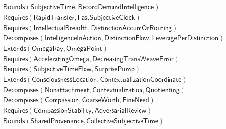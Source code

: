 \documentclass[11pt]{article}
\begin{document}
\[
\begin{aligned}
  &\mathsf{Bounds}(\mathsf{SubjectiveTime}, \mathsf{RecordDemandIntelligence}) \\
  &\mathsf{Requires}(\mathsf{RapidTransfer}, \mathsf{FastSubjectiveClock}) \\
  &\mathsf{Requires}(\mathsf{IntellectualBreadth}, \mathsf{DistinctionAccumOrRouting}) \\
  &\mathsf{Decomposes}(\mathsf{IntelligenceInAction}, \mathsf{DistinctionFlow}, \mathsf{LeveragePerDistinction}) \\
  &\mathsf{Extends}(\mathsf{OmegaRay}, \mathsf{OmegaPoint}) \\
  &\mathsf{Requires}(\mathsf{AcceleratingOmega}, \mathsf{DecreasingTransWeaveError}) \\
  &\mathsf{Requires}(\mathsf{SubjectiveTimeFlow}, \mathsf{SurprisePump}) \\
  &\mathsf{Extends}(\mathsf{ConsciousnessLocation}, \mathsf{ContextualizationCoordinate}) \\
  &\mathsf{Decomposes}(\mathsf{Nonattachment}, \mathsf{Contextualization}, \mathsf{Quotienting}) \\
  &\mathsf{Decomposes}(\mathsf{Compassion}, \mathsf{CoarseWorth}, \mathsf{FineNeed}) \\
  &\mathsf{Requires}(\mathsf{CompassionStability}, \mathsf{AdversarialReview}) \\
  &\mathsf{Bounds}(\mathsf{SharedProvenance}, \mathsf{CollectiveSubjectiveTime})
\end{aligned}
\]

\end{document}
